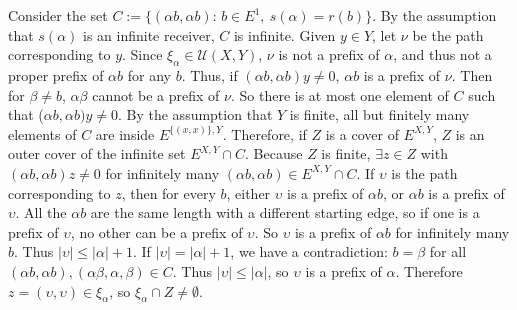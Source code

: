 \documentclass{article}
\begin{document}
Consider the set $C := \{ (\alpha b, \alpha b)\text{: } b \in E^1, \ s(\alpha) = r(b) \}$. By the assumption
that $s(\alpha)$ is an infinite receiver, $C$ is infinite. Given $y \in Y$, let $\nu$ be the path corresponding to $y$.
Since $\xi_\alpha \in \mathcal{U}(X, Y)$, $\nu$ is not a prefix of $\alpha$, and thus not a proper prefix of $\alpha b$ 
for any $b$. Thus, if $(\alpha b, \alpha b)y \neq 0$, $\alpha b$ is a prefix of $\nu$. Then for $\beta \neq b$, 
$\alpha \beta$ cannot be a prefix of $\nu$. So there is at most one element of $C$ such that ($\alpha b, \alpha b)y \neq 0$.
By the assumption that $Y$ is finite, all but finitely many elements of $C$ are inside $E^{\{(x, x)\}, Y}$. Therefore, if $Z$
is a cover of $E^{X, Y}$, $Z$ is an outer cover of the infinite set $E^{X, Y} \cap C$. Because $Z$ is finite, $\exists z \in Z$ 
with $(\alpha b, \alpha b)z \neq 0$ for infinitely many $(\alpha b, \alpha b) \in E^{X, Y} \cap C$. If $\upsilon$ is the path corresponding to $z$,
then for every $b$, either $\upsilon$ is a prefix of $\alpha b$, or $\alpha b$ is a prefix of $\upsilon$.
All the $\alpha b$ are the same length with a different starting edge, so if one is a prefix of $\upsilon$,
no other can be a prefix of $\upsilon$. So $\upsilon$ is a prefix of $\alpha b$ for infinitely many $b$. Thus $|\upsilon| \leq |\alpha| + 1$.
If $|\upsilon| = |\alpha| + 1$, we have a contradiction: $b = \beta$ for all $(\alpha b, \alpha b), (\alpha \beta, \alpha, \beta) \in C$.
Thus $|\upsilon| \leq |\alpha|$, so $\upsilon$ is a prefix of $\alpha$. Therefore $z = (\upsilon, \upsilon) \in \xi_\alpha$, so 
$\xi_\alpha \cap Z \neq \emptyset$.
\end{document}
